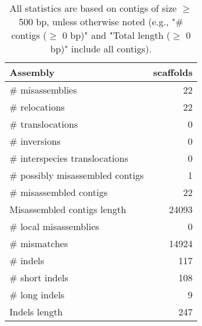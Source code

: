\documentclass[12pt,a4paper]{article}
\begin{document}
\begin{table}[ht]
\begin{center}
\caption{All statistics are based on contigs of size $\geq$ 500 bp, unless otherwise noted (e.g., "\# contigs ($\geq$ 0 bp)" and "Total length ($\geq$ 0 bp)" include all contigs).}
\begin{tabular}{|l*{1}{|r}|}
\hline
Assembly & scaffolds \\ \hline
\# misassemblies & 22 \\ \hline
\hspace{5mm}\# relocations & 22 \\ \hline
\hspace{5mm}\# translocations & 0 \\ \hline
\hspace{5mm}\# inversions & 0 \\ \hline
\hspace{5mm}\# interspecies translocations & 0 \\ \hline
\# possibly misassembled contigs & 1 \\ \hline
\# misassembled contigs & 22 \\ \hline
Misassembled contigs length & 24093 \\ \hline
\# local misassemblies & 0 \\ \hline
\# mismatches & 14924 \\ \hline
\# indels & 117 \\ \hline
\hspace{5mm}\# short indels & 108 \\ \hline
\hspace{5mm}\# long indels & 9 \\ \hline
Indels length & 247 \\ \hline
\end{tabular}
\end{center}
\end{table}
\end{document}
